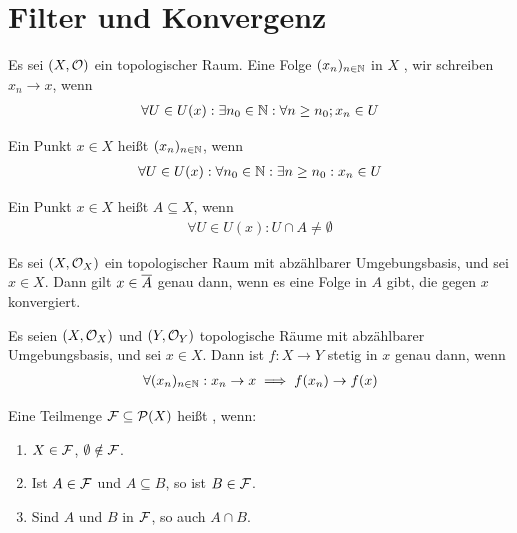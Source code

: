 \documentclass{report}
\begin{document}
\chapter{Filter und Konvergenz}
\begin{definition}
	Es sei $(X, \mathcal{O})$ ein topologischer Raum. Eine Folge $(x_n)_{n \in \mathbb{N}}$ in $X$ , wir schreiben $x_n \to x$, wenn
	\begin{align*}
		\forall U \in U(x) : \exists n_0 \in \mathbb{N} : \forall n \geq n_0 ; x_n \in U
	\end{align*}
\end{definition}
\begin{definition}
	Ein Punkt $x \in X$ heißt  $(x_n)_{n \in \mathbb{N}}$, wenn
	\begin{align*}
		\forall U \in U(x) : \forall n_0 \in \mathbb{N} : \exists n \geq n_0 : x_n \in U
	\end{align*}
\end{definition}
\begin{definition}
	Ein Punkt $x \in X$ heißt  $A \subseteq X$, wenn
	\begin{align*}
		\forall U \in U(x) : U \cap A \neq \emptyset
	\end{align*}
\end{definition}
\begin{theorem}
	Es sei $(X, \mathcal{O}_X)$ ein topologischer Raum mit abzählbarer Umgebungsbasis, und sei $x \in X$. Dann gilt $x \in \overline{{A}}$ genau dann, wenn es eine Folge in $A$ gibt, die gegen $x$ konvergiert.
\end{theorem}
\begin{theorem}
	Es seien $(X, \mathcal{O}_X)$ und $(Y, \mathcal{O}_Y)$ topologische Räume mit abzählbarer Umgebungsbasis, und sei $x \in X$. Dann ist $f : X \to Y$ stetig in $x$ genau dann, wenn
	\begin{align*}
		\forall (x_n)_{n \in \mathbb{N}} : x_n \to x \implies f(x_n) \to f(x)
	\end{align*}
\end{theorem}
\begin{definition}
	Eine Teilmenge $\mathcal{F} \subseteq \mathcal{P}(X)$ heißt , wenn:
	\begin{enumerate}
		\item $X \in \mathcal{F}$, $\emptyset \notin \mathcal{F}$.
		\item Ist $A \in \mathcal{F}$ und $A \subseteq B$, so ist $B \in \mathcal{F}$.
		\item Sind $A$ und $B$ in $\mathcal{F}$, so auch $A \cap B$.
	\end{enumerate}
\end{definition}	
\end{document}
